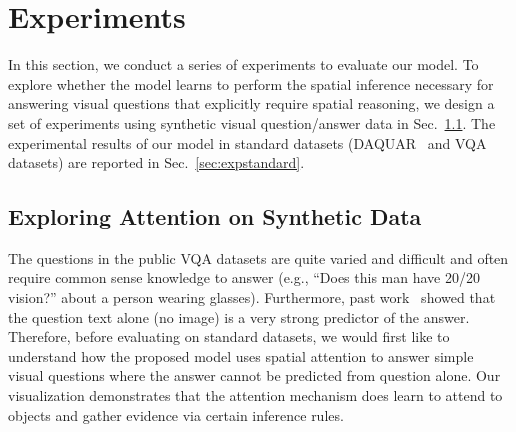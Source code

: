 \section{Experiments}
\vspace{-0.05in}

In this section, we conduct a series of experiments to evaluate our model. 
To explore whether the model learns to perform the spatial inference necessary for answering visual questions that explicitly require spatial reasoning, we design a set of experiments using synthetic visual question/answer data in Sec.~\ref{sec:synthetic1}. The experimental results of our model in standard datasets (DAQUAR~\cite{DBLP:journals/corr/MalinowskiF14} and VQA~\cite{DBLP:journals/corr/AntolALMBZP15} datasets) are reported in Sec.~\ref{sec:expstandard}.

\subsection{Exploring Attention on Synthetic Data}\label{sec:synthetic1}
The questions in the public VQA datasets are quite varied and difficult and often require common sense knowledge to answer (e.g., ``Does this man have 20/20 vision?'' about a person wearing glasses). Furthermore, past work~\cite{malinowski2015ask,DBLP:journals/corr/RenKZ15} showed that the question text alone (no image) is a very strong predictor of the answer.
Therefore, before evaluating on standard datasets, we would first like to
understand how the proposed model uses spatial attention to answer simple visual questions where the answer cannot be predicted from question alone. 
Our visualization demonstrates that the attention mechanism does learn to attend to objects and gather evidence via certain inference rules. 

